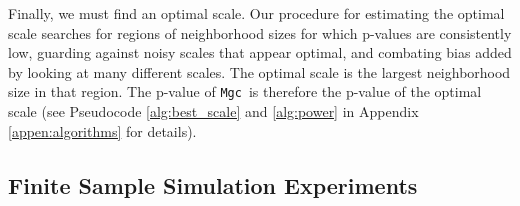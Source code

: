 \documentclass[11pt]{article}
\newcommand{\note}[2][]{\added[#1,remark={#2}]{}}
\providecommand{\sct}[1]{{\sc \texttt{#1}}}
\newcommand{\G}{C}
\newcommand{\Mgc}{\sct{Mgc}}
\newcommand{\Mcorr}{\sct{Mcorr}}
\newcommand{\cs}[1]{{\note{cs: #1}}}
\begin{document}
Finally, we must find an optimal scale.
\cs{clarify different between sims and real data}
Our procedure for estimating the optimal scale searches for regions of neighborhood sizes for which p-values are consistently low, guarding against noisy scales that appear optimal, and combating bias added by looking at many different scales.
%
The optimal scale is the largest neighborhood size in that region.
The p-value of \Mgc~is therefore the p-value of the optimal scale 
(see Pseudocode \ref{alg:best_scale} and \ref{alg:power} in Appendix \ref{appen:algorithms} for details).



\subsection*{Finite Sample Simulation Experiments}

\end{document}
